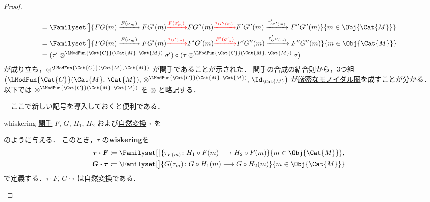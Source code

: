 \documentclass[TQFT_main]{subfiles}
\begin{document}
\begin{proof}
\begin{enumerate}
\begin{align}
            &= \Familyset[\big]{FG(m) \xrightarrow{F(\sigma_m)} FG'(m) \textcolor{red}{\xrightarrow{F(\sigma'_m)}} FG''(m) \textcolor{red}{\xrightarrow{\tau_{G''(m)}}} F'G''(m) \xrightarrow{\tau'_{G''(m)}} F''G''(m)}{m \in \Obj{\Cat{M}}} \\
            &= \Familyset[\big]{FG(m) \xrightarrow{F(\sigma_m)} FG'(m) \textcolor{red}{\xrightarrow{\tau_{G'(m)}}} F'G'(m) \textcolor{red}{\xrightarrow{F'(\sigma'_m)}} F'G''(m) \xrightarrow{\tau'_{G''(m)}} F''G''(m)}{m \in \Obj{\Cat{M}}} \\
            &= (\tau' \otimes^{\LModFun{\Cat{C}}(\Cat{M},\, \Cat{M})} \sigma') \circ (\tau \otimes^{\LModFun{\Cat{C}}(\Cat{M},\, \Cat{M})} \sigma)
        \end{align}
        が成り立ち，$\otimes^{\LModFun{\Cat{C}}(\Cat{M},\, \Cat{M})}$ が関手であることが示された．
        関手の合成の結合則から，3つ組 $\bigl(\LModFun{\Cat{C}}(\Cat{M},\, \Cat{M}),\, \otimes^{\LModFun{\Cat{C}}(\Cat{M},\, \Cat{M})},\, \Id_{\Cat{M}} \bigr)$ が\hyperref[redef:monoidal-category]{厳密なモノイダル圏}を成すことが分かる．
        以下では $\otimes^{\LModFun{\Cat{C}}(\Cat{M},\, \Cat{M})}$ を $\otimes$ と略記する．

        \hrulefill

        　ここで新しい記号を導入しておくと便利である．

        \begin{mydef}[label=def:whiskering]{whiskering}
            \hyperref[def:functor]{関手} $F,\, G,\, H_1,\, H_2$ および\hyperref[def:nat]{自然変換} $\tau$ を
            \begin{center}
            \end{center}
            のように与える．
            このとき，$\tau$ の\textbf{wiskering}を
            \begin{align}
                \bm{\tau \cdot F} &\coloneqq \Familyset[\big]{\tau_{F(m)} \colon H_1 \circ F(m) \lto H_2 \circ F(m)}{m \in \Obj{\Cat{M}}}, \\
                \bm{G \cdot \tau} &\coloneqq \Familyset[\big]{G(\tau_{m}) \colon G \circ H_1(m) \lto G \circ H_2(m)}{m \in \Obj{\Cat{M}}}
            \end{align}
            で定義する．$\tau \cdot F,\, G \cdot \tau$ は自然変換である．
        \end{mydef}
        

\end{enumerate}
\end{proof}
\end{document}
